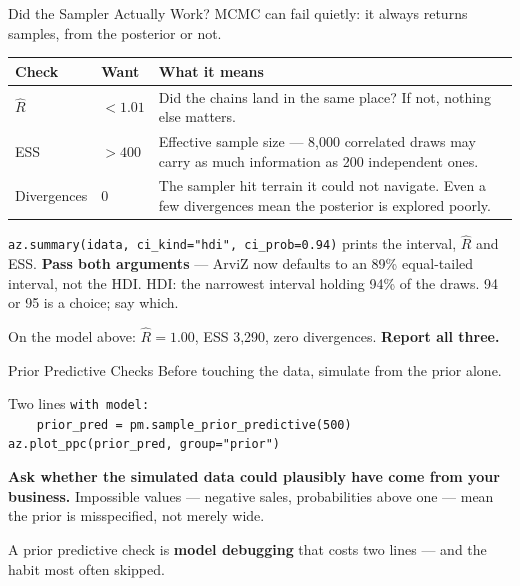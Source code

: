 \documentclass[aspectratio=169, 11pt]{beamer}
\begin{document}
\begin{frame}{Did the Sampler Actually Work? \parencite{MartinKumarLao2021}}
  MCMC can fail quietly: it always returns samples, from the posterior or not.
  \begin{center}
    {\small
    \begin{tabular}{p{2.5cm}p{3.0cm}p{6.6cm}}
      \toprule
      \textbf{Check} & \textbf{Want} & \textbf{What it means} \\
      \midrule
      $\hat{R}$ & $< 1.01$ & Did the chains land in the same place? If not, nothing else
      matters. \\[2pt]
      ESS & $> 400$ & Effective sample size --- 8{,}000 correlated draws may carry as much
      information as 200 independent ones. \\[2pt]
      Divergences & $0$ & The sampler hit terrain it could not navigate. Even a few divergences
      mean the posterior is explored poorly. \\
      \bottomrule
    \end{tabular}
    }
  \end{center}

  \texttt{az.summary(idata, ci\_kind="hdi", ci\_prob=0.94)} prints the interval, $\hat{R}$ and ESS.
  \textbf{Pass both arguments} --- ArviZ now defaults to an 89\% equal-tailed interval, not the HDI.
  HDI: the narrowest interval holding 94\% of the draws. 94 or 95 is a choice; say which.

  On the model above: $\hat{R} = 1.00$, ESS 3{,}290, zero divergences. \textbf{Report all three.}
\end{frame}

\begin{frame}{Prior Predictive Checks \parencite{McElreath2020}}
  Before touching the data, simulate from the prior alone.

  \begin{examplebox}{Two lines}
    {\scriptsize\linespread{1.0}\selectfont
    \texttt{with model:}\\
    \texttt{\mbox{}\ \ \ \ prior\_pred = pm.sample\_prior\_predictive(500)}\\[2pt]
    \texttt{az.plot\_ppc(prior\_pred, group="prior")}
    }
  \end{examplebox}

  \textbf{Ask whether the simulated data could plausibly have come from your business.}
  Impossible values --- negative sales, probabilities above one --- mean the prior is
  misspecified, not merely wide.

  \begin{keybox}
    A prior predictive check is \textbf{model debugging} that costs two lines --- and the habit
    most often skipped.
  \end{keybox}
\end{frame}
\end{document}
